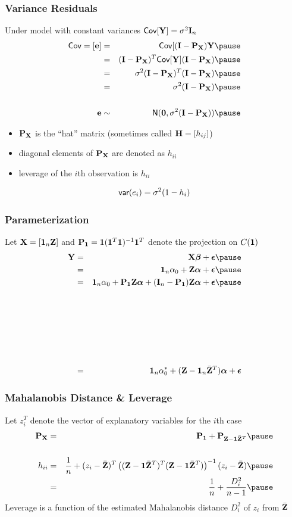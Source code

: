 \documentclass[]{beamer}
\begin{document}
\begin{frame}
  \frametitle{Variance Residuals}
  Under model with constant variances $\textsf{Cov}[\mathbf{Y}] = \sigma^2 \mathbf{I}_n$ \pause
  \begin{eqnarray*}
\Cov=[\e] & = & \Cov[(\I - \P_\X) \Y  \pause \\
 & = & (\I- \P_\X)^T \Cov[\Y](\I - \P_\X)    \pause \\
& = & \sigma^2(\I- \P_\X)^T(\I - \P_\X)  \pause \\ 
& = & \sigma^2 (\I - \P_\X)   \pause \\
& & \\
\e & \sim & \N( \zero,  \sigma^2 (\I - \P_\X) )  \pause
  \end{eqnarray*}
  \begin{itemize}
  \item $\mathbf{P}_{\mathbf{X}}$ is the ``hat'' matrix (sometimes called $\mathbf{H} =
    [h_{ij}]$)  \pause
  \item diagonal elements of $\mathbf{P}_{\mathbf{X}}$ are denoted as $h_{ii}$  \pause
  \item leverage of the $i$th observation is $h_{ii}$ \pause
  \end{itemize}
$$\textsf{var}(e_i) = \sigma^2(1 - h_{i})$$
\end{frame}

\begin{frame}
  \frametitle{Parameterization}
  Let $\mathbf{X} = [\mathbf{1}_n \mathbf{Z} ]$ and $\mathbf{P}_{\mathbf{1}} = \mathbf{1}( \mathbf{1}^T \mathbf{1})^{-1}
  \mathbf{1}^T$ denote the projection on $C(\mathbf{1})$  \pause
  \begin{eqnarray*}
\Y  & = & \X \b + \eps  \pause \\
 & = & \one_n \alpha_0 + \Z \alphav + \eps   \pause \\
    & = & \one_n \alpha_0 + \P_\one\Z \alphav + (\I_n - \P_\one)\Z
    \alphav + \eps  \pause
    \\
& & \\ & & \\ & & \\
& & \\ & & \\ & & \\
    & = &  \one_n \alpha_0^* + (\Z - \one_n \bar{\Z}^T) \alphav + \eps 
  \end{eqnarray*}

\end{frame}
\begin{frame}
  \frametitle{Mahalanobis Distance \& Leverage}
Let $z_i^T$ denote the vector of explanatory variables for the $i$th case   \pause
  \begin{eqnarray*}
\P_\X&  = &  \P_\one + \P_{\Z - \one \bar{\Z}^T}  \pause \\    
    &  &  \\
h_{ii} & = & \frac{1}{n} + (z_i - \bar{\Z})^T 
\left( 
(\Z - \one \bar{\Z}^T)^T(\Z - \one \bar{\Z}^T)
\right)^{-1} 
(z_i - \bar{\Z})  \pause \\
 & = & \frac{1}{n} + \frac{D^2_i}{n-1}  \pause
  \end{eqnarray*}
Leverage is a function of  the estimated Mahalanobis distance $D_i^2$ of $z_i$ from $\bar{\mathbf{Z}}$
\end{frame}
\end{document}
